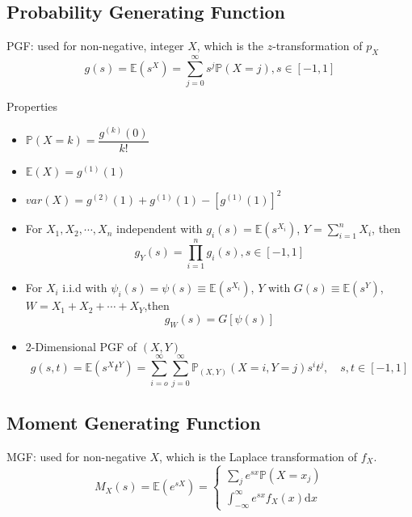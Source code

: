\subsection{Probability Generating Function}
    PGF: used for non-negative, integer $X$, which is the $ z $-transformation of $ p_X $
    \begin{equation}
        g(s)=\mathbb{E}(s^X)=\sum_{j=0}^\infty s^j\mathbb{P}(X=j)    ,s\in[-1,1]
    \end{equation}

\begin{point}
        Properties
\end{point}
    \begin{itemize}[topsep=2pt,itemsep=0pt]
        \item $\mathbb{P}(X=k)=\dfrac{g^{(k)}(0)}{k!}$
        \item $\mathbb{E}(X)=g^{(1)}(1)$
        \item $var(X)=g^{(2)}(1)+g^{(1)}(1)-[g^{(1)}(1)]^2 $
        \item For $X_1,X_2,\cdots,X_n$ independent with $g_i(s)=\mathbb{E}(s^{X_i})$, $Y={\displaystyle \sum_{i=1}^n} X_i$, then
        \begin{equation}    
            g_Y(s)=\prod_{i=1}^n g_i(s),s\in[-1,1]
        \end{equation}
        \item For ${X_i}$ i.i.d with $\psi_i(s)=\psi(s)\equiv \mathbb{E}(s^{X_i})$, $Y$ with $G(s)\equiv\mathbb{E}(s^{Y})$, $W=X_1+X_2+\cdots +X_Y$,then
        \begin{equation}    
            g_W(s)=G[\psi(s)]    
        \end{equation}
        \item 2-Dimensional PGF of $(X,Y)$
        \begin{equation}    
            g(s,t)=\mathbb{E}(s^Xt^Y)=\sum_{i=o}^\infty\sum_{j=0}^\infty \mathbb{P}_{(X,Y)}(X=i,Y=j)s^it^j,\quad s,t\in[-1,1]
        \end{equation}
    \end{itemize}
\subsection{Moment Generating Function}
    MGF: used for non-negative $ X $, which is the Laplace transformation of $ f_X $.
    \begin{equation}
        M_X(s)=\mathbb{E}(e^{sX})=\begin{cases}
            \sum_je^{sx}\mathbb{P}(X=x_j)\\
            \int_{-\infty}^\infty e^{sx}f_X(x)\mathrm{d}x
        \end{cases}
    \end{equation}

